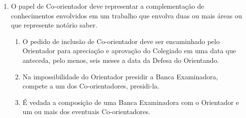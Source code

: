 \documentclass{article}
\begin{document}
\begin{enumerate}
	\item O papel de Co-orientador deve representar a complementação de conhecimentos envolvidos em um trabalho que envolva duas ou mais áreas ou que represente notório saber.
	\begin{enumerate}
		\item O pedido de inclusão de Co-orientador deve ser encaminhado pelo Orientador para apreciação e aprovação do Colegiado em uma data que anteceda, pelo menos, seis meses a data da Defesa do Orientando.
		\item Na impossibilidade do Orientador presidir a Banca Examinadora, compete a um dos Co-orientadores, presidi-la.
		\item É vedada a composição de uma Banca Examinadora com o Orientador e um ou mais dos eventuais Co-orientadores.
	\end{enumerate}

\end{enumerate}
\end{document}
